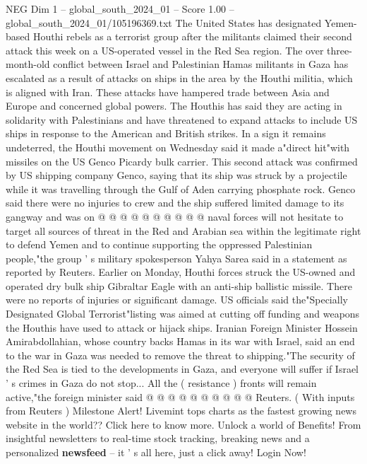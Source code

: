 \begin{textsample}{NEG Dim 1 – global\_south\_2024\_01 – Score 1.00 – global\_south\_2024\_01/105196369.txt}  \label{ex:f1_neg_331}
The United States has designated Yemen-based Houthi rebels as a terrorist group after the militants claimed their second attack this week on a US-operated vessel in the Red Sea region.
The over three-month-old conflict between Israel and Palestinian Hamas militants in Gaza has escalated as a result of attacks on ships in the area by the Houthi militia, which is aligned with Iran.
These attacks have hampered trade between Asia and Europe and concerned global powers.
The Houthis has said they are acting in solidarity with Palestinians and have threatened to expand attacks to include US ships in response to the American and British strikes.
In a sign it remains undeterred, the Houthi movement on Wednesday said it made a"direct hit"with missiles on the US Genco Picardy bulk carrier.
This second attack was confirmed by US shipping company Genco, saying that its ship was struck by a projectile while it was travelling through the Gulf of Aden carrying phosphate rock.
Genco said there were no injuries to crew and the ship suffered limited damage to its gangway and was on @ @ @ @ @ @ @ @ @ @ naval forces will not hesitate to target all sources of threat in the Red and Arabian sea within the legitimate right to defend Yemen and to continue supporting the oppressed Palestinian people,"the group ' s military spokesperson Yahya Sarea said in a statement as reported by Reuters.
Earlier on Monday, Houthi forces struck the US-owned and operated dry bulk ship Gibraltar Eagle with an anti-ship ballistic missile.
There were no reports of injuries or significant damage.
US officials said the"Specially Designated Global Terrorist"listing was aimed at cutting off funding and weapons the Houthis have used to attack or hijack ships.
Iranian Foreign Minister Hossein Amirabdollahian, whose country backs Hamas in its war with Israel, said an end to the war in Gaza was needed to remove the threat to shipping."The security of the Red Sea is tied to the developments in Gaza, and everyone will suffer if Israel ' s crimes in Gaza do not stop...
All the ( resistance ) fronts will remain active,"the foreign minister said @ @ @ @ @ @ @ @ @ @ Reuters. ( With inputs from Reuters ) Milestone Alert!
Livemint tops charts as the fastest growing news website in the world??
Click here to know more.
Unlock a world of Benefits!
From insightful newsletters to real-time stock tracking, breaking news and a personalized \textbf{newsfeed} -- it ' s all here, just a click away!
Login Now!

\end{textsample}
